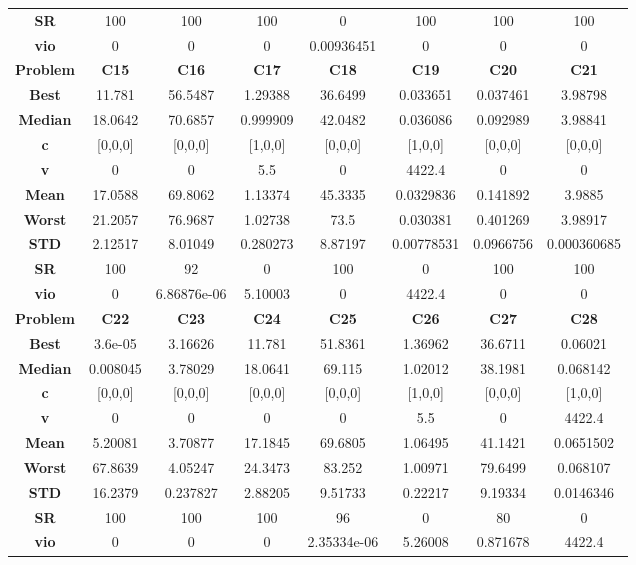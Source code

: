 \documentclass{IEEEtran}
\begin{document}
\begin{center}
\begin{tabular}{|c|c|c|c|c|c|c|c|}
    \textbf{SR} & 100 & 100 & 100 & 0 & 100 & 100 & 100\\ 
    \textbf{vio} & 0 & 0 & 0 & 0.00936451 & 0 & 0 & 0\\ 
    \hline 
    \hline 
    \textbf{Problem} & \textbf{C15} & \textbf{C16} & \textbf{C17} & \textbf{C18} & \textbf{C19} & \textbf{C20} & \textbf{C21} \\ 
    \hline\hline 
    \textbf{Best} & 11.781 & 56.5487 & 1.29388 & 36.6499 & 0.033651 & 0.037461 & 3.98798\\ 
    \textbf{Median} & 18.0642 & 70.6857 & 0.999909 & 42.0482 & 0.036086 & 0.092989 & 3.98841\\ 
    \textbf{c} & [0,0,0] & [0,0,0] & [1,0,0] & [0,0,0] & [1,0,0] & [0,0,0] & [0,0,0]\\ 
    \textbf{v} & 0 & 0 & 5.5 & 0 & 4422.4 & 0 & 0\\ 
    \textbf{Mean} & 17.0588 & 69.8062 & 1.13374 & 45.3335 & 0.0329836 & 0.141892 & 3.9885\\ 
    \textbf{Worst} & 21.2057 & 76.9687 & 1.02738 & 73.5 & 0.030381 & 0.401269 & 3.98917\\ 
    \textbf{STD} & 2.12517 & 8.01049 & 0.280273 & 8.87197 & 0.00778531 & 0.0966756 & 0.000360685\\ 
    \textbf{SR} & 100 & 92 & 0 & 100 & 0 & 100 & 100\\ 
    \textbf{vio} & 0 & 6.86876e-06 & 5.10003 & 0 & 4422.4 & 0 & 0\\ 
    \hline 
    \hline 
    \textbf{Problem} & \textbf{C22} & \textbf{C23} & \textbf{C24} & \textbf{C25} & \textbf{C26} & \textbf{C27} & \textbf{C28} \\ 
    \hline\hline 
    \textbf{Best} & 3.6e-05 & 3.16626 & 11.781 & 51.8361 & 1.36962 & 36.6711 & 0.06021\\ 
    \textbf{Median} & 0.008045 & 3.78029 & 18.0641 & 69.115 & 1.02012 & 38.1981 & 0.068142\\ 
    \textbf{c} & [0,0,0] & [0,0,0] & [0,0,0] & [0,0,0] & [1,0,0] & [0,0,0] & [1,0,0]\\ 
    \textbf{v} & 0 & 0 & 0 & 0 & 5.5 & 0 & 4422.4\\ 
    \textbf{Mean} & 5.20081 & 3.70877 & 17.1845 & 69.6805 & 1.06495 & 41.1421 & 0.0651502\\ 
    \textbf{Worst} & 67.8639 & 4.05247 & 24.3473 & 83.252 & 1.00971 & 79.6499 & 0.068107\\ 
    \textbf{STD} & 16.2379 & 0.237827 & 2.88205 & 9.51733 & 0.22217 & 9.19334 & 0.0146346\\ 
    \textbf{SR} & 100 & 100 & 100 & 96 & 0 & 80 & 0\\ 
    \textbf{vio} & 0 & 0 & 0 & 2.35334e-06 & 5.26008 & 0.871678 & 4422.4\\ 
    \hline 
  \end{tabular}
\end{center}
\newpage
\end{document}
